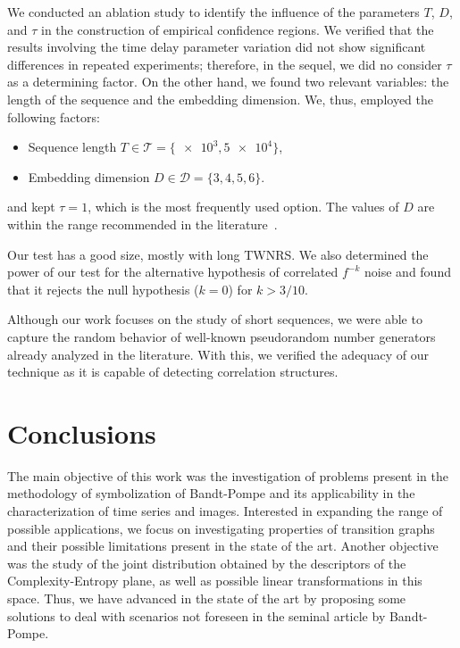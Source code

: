 \documentclass[a4,11pt]{pssbmac}
\begin{document}
	We conducted an ablation study to identify the influence of the parameters $T$, $D$, and $\tau$ in the construction of empirical confidence regions.
	We verified that the results involving the time delay parameter variation did not show significant differences in repeated experiments; therefore, in the sequel, we did no consider $\tau$ as a determining factor.
	On the other hand, we found two relevant variables: the length of the sequence and the embedding dimension.
	We, thus, employed the following factors:
	\begin{itemize}
		\item Sequence length $T\in\mathcal T=\{ \num[scientific-notation=true]{e3}, \num[scientific-notation=true]{5 e4}\}$,
		\item Embedding dimension $D\in\mathcal D=\{3, 4, 5, 6\}$.
	\end{itemize}
	and kept $\tau=1$, which is the most frequently used option.
	The values of $D$ are within the range recommended in the literature~\cite{PermutationEntropyBandtPompe}.
	
	Our test has a good size, mostly with long TWNRS.
	We also determined the power of our test for the alternative hypothesis of correlated $f^{-k}$ noise and found that it rejects the null hypothesis ($k=0$) for $k>3/10$.
	
	Although our work focuses on the study of short sequences, we were able to capture the random behavior of well-known pseudorandom number generators already analyzed in the literature. 
	With this, we verified the adequacy of our technique as it is capable of detecting correlation structures.
	
	\section{Conclusions} 
	
	The main objective of this work was the investigation of problems present in the methodology of symbolization of Bandt-Pompe and its applicability in the characterization of time series and images.
	Interested in expanding the range of possible applications, we focus on investigating properties of transition graphs and their possible limitations present in the state of the art.
	Another objective was the study of the joint distribution obtained by the descriptors of the Complexity-Entropy plane, as well as possible linear transformations in this space.
	Thus, we have advanced in the state of the art by proposing some solutions to deal with scenarios not foreseen in the seminal article by Bandt-Pompe. 
	
\end{document}
